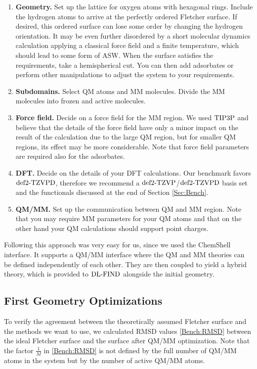 \begin{enumerate}
  \item \textbf{Geometry.} Set up the lattice for oxygen atoms with hexagonal
  rings. Include the hydrogen atoms to arrive at the perfectly ordered Fletcher
  surface. If desired, this ordered surface can lose some order by changing the
  hydrogen orientation. It may be even further disordered by a short molecular
  dynamics calculation applying a classical force field and a finite
  temperature, which should lead to some form of ASW. When the surface satisfies the
  requirements, take a hemispherical cut. You can then add adsorbates or 
  perform other manipulations to adjust the system to your requirements.
  \item \textbf{Subdomains.} Select QM atoms and MM molecules. Divide
  the MM molecules into frozen and active molecules.
  \item \textbf{Force field.} Decide on a force field for the MM region.
  We used $\text{TIP3P}$ and believe that the details of the force field have only
  a minor impact on the result of the calculation due to the large
  QM region, but for smaller QM regions, its effect may be more considerable.
  Note that force field parameters are required also for the adsorbates.
  \item \textbf{DFT.} Decide on the details of your DFT calculations. Our
  benchmark favors $\text{def2-TZVPD}$, therefore we recommend a $\text{def2-TZVP}$/$\text{def2-TZVPD}$ basis
  set and the functionals discussed at the end of Section \ref{Sec:Bench}.
  \item \textbf{QM/MM.} Set up the communication between QM and MM region. Note
  that you may require MM parameters for your QM atoms and that on the other
  hand your QM calculations should support point charges.
\end{enumerate}
Following this approach was very easy for us, since we used the
ChemShell interface. It supports a QM/MM interface where the QM and MM
theories can be defined independently of each other. They are then coupled to
yield a hybrid theory, which is provided to $\text{DL-FIND}$ alongside the initial
geometry.

\subsection{First Geometry Optimizations}
\label{Sec:Ads:Optima}

To verify the agreement between the theoretically assumed Fletcher surface and the
methods we want to use, we calculated RMSD values \eqref{Bench:RMSD} between
the ideal Fletcher surface and the surface after QM/MM optimization.
Note that the factor $\frac 1 M$ in \eqref{Bench:RMSD} is not defined by the
full number of QM/MM atoms in the system but by the number of active QM/MM atoms.

